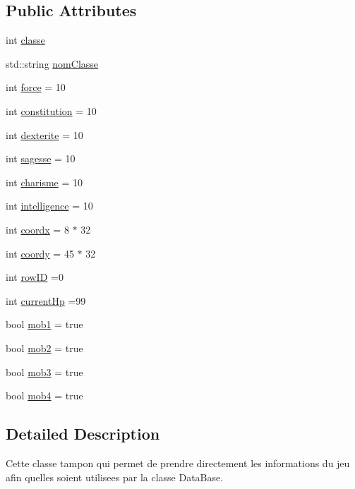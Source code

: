 \subsection*{Public Attributes}
\begin{DoxyCompactItemize}
\item 
int \mbox{\hyperlink{classsauvegarde_aac8c952d4816b64287a25d945d3213c2}{classe}}
\item 
std\+::string \mbox{\hyperlink{classsauvegarde_a3c9a4c2dbb3da4fd09c816012ee78655}{nom\+Classe}}
\item 
int \mbox{\hyperlink{classsauvegarde_a858afe68a31658d493f3f5abf4bb997a}{force}} = 10
\item 
int \mbox{\hyperlink{classsauvegarde_ad29a99de4fba76c900edfd5c4c814ec8}{constitution}} = 10
\item 
int \mbox{\hyperlink{classsauvegarde_ada794b3462e13aff90bf35f36098da3d}{dexterite}} = 10
\item 
int \mbox{\hyperlink{classsauvegarde_ad53565a7435fc18c5a4ee09709e3dbdb}{sagesse}} = 10
\item 
int \mbox{\hyperlink{classsauvegarde_a4e6c6ce21ae52120984f79144ddee95d}{charisme}} = 10
\item 
int \mbox{\hyperlink{classsauvegarde_a8553de458faa853addf2c0e908c963c1}{intelligence}} = 10
\item 
int \mbox{\hyperlink{classsauvegarde_aae22f75401bf04fb42dc28c3e03ae4a2}{coordx}} = 8 $\ast$ 32
\item 
int \mbox{\hyperlink{classsauvegarde_afacd741e4368c4c16e2f33f080e99002}{coordy}} = 45 $\ast$ 32
\item 
int \mbox{\hyperlink{classsauvegarde_a85065e9b3b749e04d24c18238a4d74f1}{row\+ID}} =0
\item 
int \mbox{\hyperlink{classsauvegarde_af2a0ae926aeb4b4b97a6e993d82d6eae}{current\+Hp}} =99
\item 
bool \mbox{\hyperlink{classsauvegarde_a6622f2f3ed50a4cb3a318e9fe32eeec1}{mob1}} = true
\item 
bool \mbox{\hyperlink{classsauvegarde_af6635c848e63bfa93c24386434c67823}{mob2}} = true
\item 
bool \mbox{\hyperlink{classsauvegarde_a335355cf40458a3587c66db08951d2a8}{mob3}} = true
\item 
bool \mbox{\hyperlink{classsauvegarde_a05cc593a25304fe90757c1633870f317}{mob4}} = true
\end{DoxyCompactItemize}


\subsection{Detailed Description}
Cette classe tampon qui permet de prendre directement les informations du jeu afin qu\textquotesingle{}elles soient utilisees par la classe Data\+Base. 

